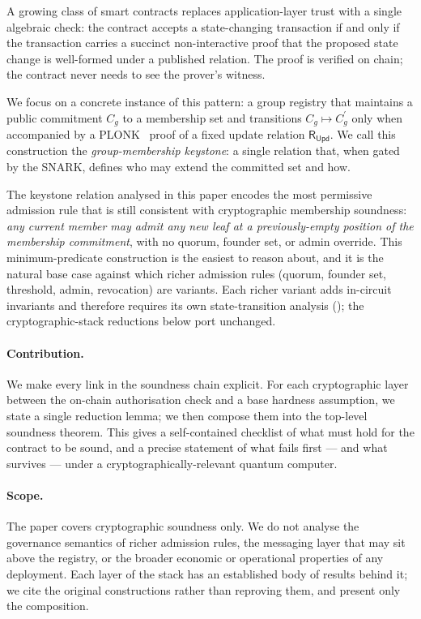 \documentclass[11pt,a4paper]{article}
\theoremstyle{plain}
\theoremstyle{definition}
\newcommand{\Cg}{C_g}
\newcommand{\Cgp}{{C_g^{\prime}}}
\newcommand{\RUpd}{\mathsf{R}_{\mathsf{Upd}}}
\begin{document}
A growing class of smart contracts replaces application-layer
trust with a single algebraic check: the contract accepts a
state-changing transaction if and only if the transaction carries
a succinct non-interactive proof that the proposed state change
is well-formed under a published relation. The proof is verified
on chain; the contract never needs to see the prover's witness.

We focus on a concrete instance of this pattern: a group
registry that maintains a public commitment $\Cg$ to a
membership set and transitions $\Cg \mapsto \Cgp$ only when
accompanied by a PLONK~\cite{gabizon-2019-plonk} proof of a fixed
update relation $\RUpd$. We call this construction the
\emph{group-membership keystone}: a single relation that, when
gated by the SNARK, defines who may extend the committed set and
how.

The keystone relation analysed in this paper encodes the
most permissive admission rule that is still consistent with
cryptographic membership soundness: \emph{any current member may
admit any new leaf at a previously-empty position of the
membership commitment}, with no quorum, founder set, or admin
override. This minimum-predicate construction is the easiest to
reason about, and it is the natural base case against which
richer admission rules (quorum, founder set, threshold, admin,
revocation) are variants. Each richer variant adds in-circuit
invariants and therefore requires its own state-transition
analysis (); the cryptographic-stack reductions
below port unchanged.

\paragraph{Contribution.} We make every link in the soundness
chain explicit. For each cryptographic layer between the
on-chain authorisation check and a base hardness assumption, we
state a single reduction lemma; we then compose them into the
top-level soundness theorem. This gives a self-contained
checklist of what must hold for the contract to be sound, and a
precise statement of what fails first --- and what survives ---
under a cryptographically-relevant quantum computer.

\paragraph{Scope.} The paper covers cryptographic soundness
only. We do not analyse the governance semantics of richer
admission rules, the messaging layer that may sit above the
registry, or the broader economic or operational properties of
any deployment. Each layer of the stack has an established body
of results behind it; we cite the original constructions rather
than reproving them, and present only the composition.
\end{document}
